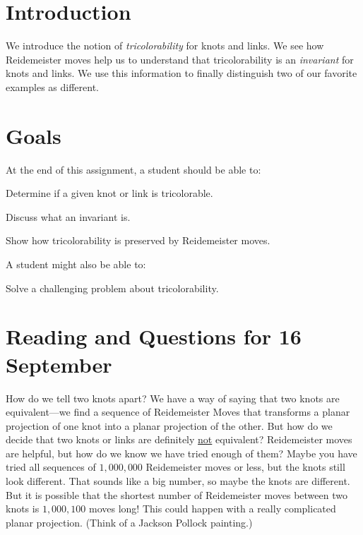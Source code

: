 \documentclass[12pt,letterpaper]{article}
\theoremstyle{definition}
\begin{document}
\setlength{\parskip}{1ex plus 0.5ex minus 0.2ex}
\setlength{\parindent}{0pt}

\pagestyle{fancy}
\cfoot{}

\section*{Introduction}
We introduce the notion of \emph{tricolorability} for knots and links. We see how Reidemeister moves help us to understand that tricolorability is an \emph{invariant} for knots and links. We use this information to finally distinguish two of our favorite examples as different.

\section*{Goals}
At the end of this assignment, a student should be able to:
\begin{compactitem}
\item Determine if a given knot or link is tricolorable.
\item Discuss what an invariant is.
\item Show how tricolorability is preserved by Reidemeister moves.
\end{compactitem}
A student might also be able to:
\begin{compactitem}
\item Solve a challenging problem about tricolorability.
\end{compactitem}

\section*{Reading and Questions for 16 September}

How do we tell two knots apart?
We have a way of saying that two knots are equivalent---we find a sequence of Reidemeister Moves that transforms a planar projection of one knot into a planar projection of the other.
But how do we decide that two  knots or links are definitely \underline{not} equivalent?
Reidemeister moves are helpful, but how do we know we have tried enough of them?
Maybe you have tried all sequences of $1,000,000$ Reidemeister moves or less, but the knots still look different.
That sounds like a big number, so maybe the knots are different.
But it is possible that the shortest number of Reidemeister moves between two knots is $1,000,100$ moves long!
This could happen with a really complicated planar projection.
(Think of a Jackson Pollock painting.)
\end{document}
